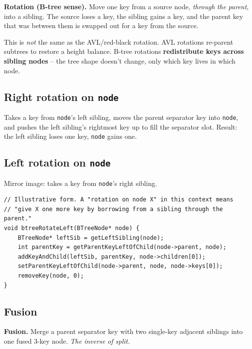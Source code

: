 \documentclass[11pt]{article}
\begin{document}
\begin{defnbox}
\textbf{Rotation (B-tree sense).} Move one key from a source node, \emph{through the parent}, into a sibling. The source loses a key, the sibling gains a key, and the parent key that was between them is swapped out for a key from the source.
\end{defnbox}

\begin{ideabox}
This is \emph{not} the same as the AVL/red-black rotation. AVL rotations re-parent subtrees to restore a height balance. B-tree rotations \textbf{redistribute keys across sibling nodes} -- the tree shape doesn't change, only which key lives in which node.
\end{ideabox}

\subsection*{Right rotation on \texttt{node}}

Takes a key from \texttt{node}'s left sibling, moves the parent separator key into \texttt{node}, and pushes the left sibling's rightmost key up to fill the separator slot. Result: the left sibling loses one key, \texttt{node} gains one.

\subsection*{Left rotation on \texttt{node}}

Mirror image: takes a key from \texttt{node}'s right sibling.

\begin{lstlisting}[basicstyle=\ttfamily\small,frame=single]
// Illustrative form. A "rotation on node X" in this context means
// "give X one more key by borrowing from a sibling through the parent."
void btreeRotateLeft(BTreeNode* node) {
    BTreeNode* leftSib = getLeftSibling(node);
    int parentKey = getParentKeyLeftOfChild(node->parent, node);
    addKeyAndChild(leftSib, parentKey, node->children[0]);
    setParentKeyLeftOfChild(node->parent, node, node->keys[0]);
    removeKey(node, 0);
}
\end{lstlisting}

\subsection*{Fusion}

\begin{defnbox}
\textbf{Fusion.} Merge a parent separator key with two single-key adjacent siblings into one fused 3-key node. \emph{The inverse of split.}
\end{defnbox}
\end{document}
